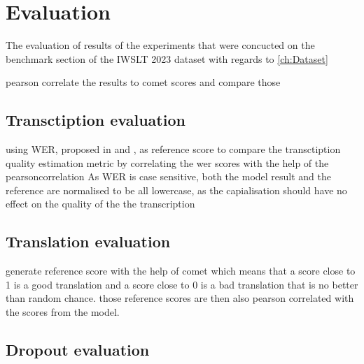 
\chapter{Evaluation}
\label{ch:Evaluation}
The evaluation of results of the experiments that were concucted on the benchmark section of the IWSLT 2023 dataset \cite{sperber2024evaluating} with regards to \ref{ch:Dataset}

pearson correlate \cite{2020SciPy-NMeth} the results to comet scores and compare those 

\section{Transctiption evaluation}


using WER, proposed in \cite{woodard1982} and \cite{morris2004}, as reference score to compare the transctiption quality estimation metric by correlating the wer scores with the help of the pearsoncorrelation \cite{2020SciPy-NMeth}
As WER is case sensitive, both the model result and the reference are normalised to be all lowercase, as the capialisation should have no effect on the quality of the the transcription
\section{Translation evaluation}

generate reference score with the help of comet \cite{rei-etal-2020-comet} which means that a score close to 1 is a good translation and a score close to 0 is a bad translation that is no better than random chance.
those reference scores are then also pearson correlated with the scores from the model. 

\section{Dropout evaluation}


